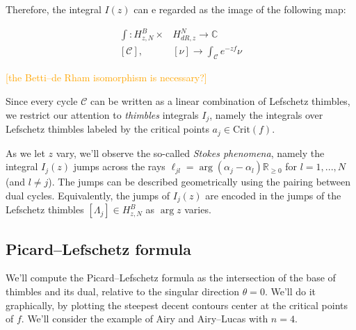 \documentclass{article}
\theoremstyle{definition}
\newcommand{\R}{\mathbb{R}}
\newcommand{\C}{\mathbb{C}}
\begin{document}
Therefore, the integral $I(z)$ can e regarded as the image of the following map: 

\begin{align*}
    \int \colon  H_{z,N}^{B} \times & H_{dR,z}^N \to \C \\
       [\mathcal{C}] ,\,\, & [\nu] \to \int_{\mathcal{C}}e^{-zf}\nu
\end{align*}

\textcolor{orange}{[the Betti--de Rham isomorphism is necessary?]}

Since every cycle $\mathcal{C}$ can be written as a linear combination of Lefschetz thimbles, we restrict our attention to  \textit{thimbles} integrals $I_j$, namely the integrals over Lefschetz thimbles labeled by the critical points $a_j\in\text{Crit}(f)$.

As we let $z$ vary, we’ll observe the so-called \textit{Stokes phenomena}, namely the integral $I_j(z)$ jumps across the rays $\ell_{jl}=\arg(\alpha_j-\alpha_l)\R_{\geq 0}$ for $l=1,...,N$ (and $l\neq j$). The jumps can be described geometrically using the pairing between dual cycles. Equivalently, the jumps of $I_j(z)$ are encoded in the jumps of the Lefschetz thimbles $[\Lambda_j]\in H_{z,N}^B$ as $\arg z$ varies. %

\subsection{Picard--Lefschetz formula}\label{sec:Picard-Lefschetz}
We'll compute the Picard--Lefschetz formula as the intersection of the base of thimbles and its dual, relative to the singular direction $\theta=0$. We'll do it graphically, by plotting the steepest decent contours center at the critical points of $f$. We'll consider the example of Airy and Airy--Lucas with $n=4$.
\end{document}
